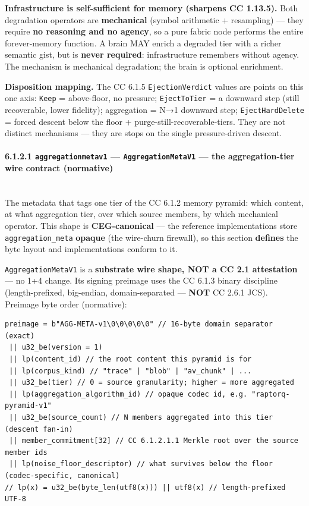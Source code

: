 \documentclass[11pt]{article}
\begin{document}
\textbf{Infrastructure is self-sufficient for memory (sharpens CC 1.13.5).} Both degradation operators are \textbf{mechanical} (symbol arithmetic + resampling) — they require \textbf{no reasoning and no agency}, so a pure fabric node performs the entire forever-memory function. A brain MAY enrich a degraded tier with a richer semantic gist, but is \textbf{never required}: infrastructure remembers without agency. The mechanism is mechanical degradation; the brain is optional enrichment.


\textbf{Disposition mapping.} The CC 6.1.5 \texttt{EjectionVerdict} values are points on this one axis: \texttt{Keep} = above-floor, no pressure; \texttt{EjectToTier} = a downward step (still recoverable, lower fidelity); aggregation = N→1 downward step; \texttt{EjectHardDelete} = forced descent below the floor + purge-still-recoverable-tiers. They are not distinct mechanisms — they are stops on the single pressure-driven descent.


\paragraph{6.1.2.1 \texttt{aggregationmetav1} — \texttt{AggregationMetaV1} — the aggregation-tier wire contract (normative)}\mbox{}\\


The metadata that tags one tier of the CC 6.1.2 memory pyramid: which content, at what aggregation tier, over which source members, by which mechanical operator. This shape is \textbf{CEG-canonical} — the reference implementations store \texttt{aggregation\_meta} \textbf{opaque} (the wire-churn firewall), so this section \textbf{defines} the byte layout and implementations conform to it.


\texttt{AggregationMetaV1} is a \textbf{substrate wire shape, NOT a CC 2.1 attestation} — no 1+4 change. Its signing preimage uses the CC 6.1.3 binary discipline (length-prefixed, big-endian, domain-separated — \textbf{NOT} CC 2.6.1 JCS). Preimage byte order (normative):


\begin{lstlisting}
preimage = b"AGG-META-v1\0\0\0\0\0" // 16-byte domain separator (exact)
 || u32_be(version = 1)
 || lp(content_id) // the root content this pyramid is for
 || lp(corpus_kind) // "trace" | "blob" | "av_chunk" | ...
 || u32_be(tier) // 0 = source granularity; higher = more aggregated
 || lp(aggregation_algorithm_id) // opaque codec id, e.g. "raptorq-pyramid-v1"
 || u32_be(source_count) // N members aggregated into this tier (descent fan-in)
 || member_commitment[32] // CC 6.1.2.1.1 Merkle root over the source member ids
 || lp(noise_floor_descriptor) // what survives below the floor (codec-specific, canonical)
// lp(x) = u32_be(byte_len(utf8(x))) || utf8(x) // length-prefixed UTF-8
\end{lstlisting}
\end{document}
